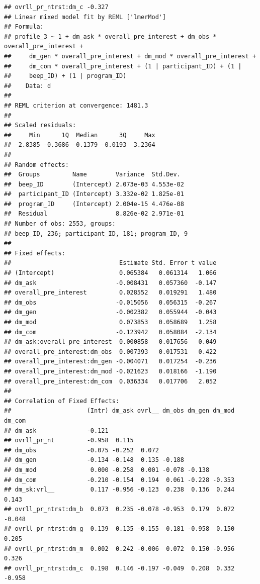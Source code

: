 \documentclass[]{msu-thesis}
\theoremstyle{definition}
\theoremstyle{definition}
\theoremstyle{definition}
\theoremstyle{remark}
\begin{document}
\begin{verbatim}
## ovrll_pr_ntrst:dm_c -0.327             
## Linear mixed model fit by REML ['lmerMod']
## Formula: 
## profile_3 ~ 1 + dm_ask * overall_pre_interest + dm_obs * overall_pre_interest +  
##     dm_gen * overall_pre_interest + dm_mod * overall_pre_interest +  
##     dm_com * overall_pre_interest + (1 | participant_ID) + (1 |  
##     beep_ID) + (1 | program_ID)
##    Data: d
## 
## REML criterion at convergence: 1481.3
## 
## Scaled residuals: 
##     Min      1Q  Median      3Q     Max 
## -2.8385 -0.3686 -0.1379 -0.0193  3.2364 
## 
## Random effects:
##  Groups         Name        Variance  Std.Dev. 
##  beep_ID        (Intercept) 2.073e-03 4.553e-02
##  participant_ID (Intercept) 3.332e-02 1.825e-01
##  program_ID     (Intercept) 2.004e-15 4.476e-08
##  Residual                   8.826e-02 2.971e-01
## Number of obs: 2553, groups:  
## beep_ID, 236; participant_ID, 181; program_ID, 9
## 
## Fixed effects:
##                              Estimate Std. Error t value
## (Intercept)                  0.065384   0.061314   1.066
## dm_ask                      -0.008431   0.057360  -0.147
## overall_pre_interest         0.028552   0.019291   1.480
## dm_obs                      -0.015056   0.056315  -0.267
## dm_gen                      -0.002382   0.055944  -0.043
## dm_mod                       0.073853   0.058689   1.258
## dm_com                      -0.123942   0.058084  -2.134
## dm_ask:overall_pre_interest  0.000858   0.017656   0.049
## overall_pre_interest:dm_obs  0.007393   0.017531   0.422
## overall_pre_interest:dm_gen -0.004071   0.017254  -0.236
## overall_pre_interest:dm_mod -0.021623   0.018166  -1.190
## overall_pre_interest:dm_com  0.036334   0.017706   2.052
## 
## Correlation of Fixed Effects:
##                     (Intr) dm_ask ovrl__ dm_obs dm_gen dm_mod dm_com
## dm_ask              -0.121                                          
## ovrll_pr_nt         -0.958  0.115                                   
## dm_obs              -0.075 -0.252  0.072                            
## dm_gen              -0.134 -0.148  0.135 -0.188                     
## dm_mod               0.000 -0.258  0.001 -0.078 -0.138              
## dm_com              -0.210 -0.154  0.194  0.061 -0.228 -0.353       
## dm_sk:vrl__          0.117 -0.956 -0.123  0.238  0.136  0.244  0.143
## ovrll_pr_ntrst:dm_b  0.073  0.235 -0.078 -0.953  0.179  0.072 -0.048
## ovrll_pr_ntrst:dm_g  0.139  0.135 -0.155  0.181 -0.958  0.150  0.205
## ovrll_pr_ntrst:dm_m  0.002  0.242 -0.006  0.072  0.150 -0.956  0.326
## ovrll_pr_ntrst:dm_c  0.198  0.146 -0.197 -0.049  0.208  0.332 -0.958

\end{verbatim}
\end{document}
